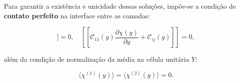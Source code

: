 Para garantir a existência e unicidade dessas soluções, impõe-se a condição de \textbf{contato perfeito} na interface entre as camadas:

\begin{equation}
  [[\chi(y)]] = 0, \quad \left[\left[ \mathcal{C}_{11}(y) \frac{\partial \chi(y)}{\partial y} + \mathcal{C}_{ij}(y) \right]\right] = 0,
\end{equation}

além da condição de normalização da média na célula unitária $Y$:

\begin{equation}
  \langle \chi^{(1)}(y) \rangle = \langle \chi^{(2)}(y) \rangle = 0.
\end{equation}
